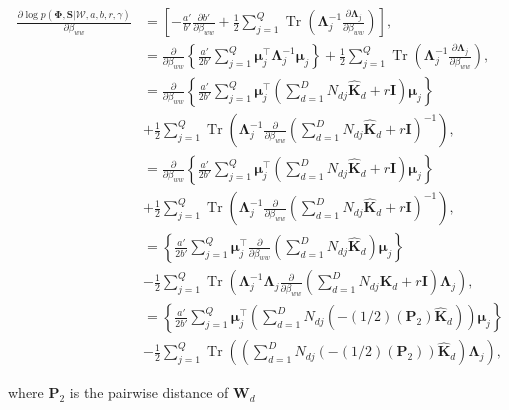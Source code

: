 \documentclass[]{article}
\newcommand{\C}{\boldsymbol{\Lambda}_j}
\newcommand{\muJ}{\boldsymbol{\mu}_j}
\newcommand{\W}{\boldsymbol{\mathcal{W}}}
\newcommand{\projMatI}{\mathbf{W}_d}
\newcommand{\Kaww}{\mathbf{\hat{K}}_d }
\newcommand{\likel}{\log p\left(\boldsymbol{\Phi},\mathbf{S}|\W,a,b,r,\gamma\right)}
\begin{document}
\begin{align}
\frac{\partial \likel}{\partial \beta_{ww}} &= \left[-\frac{a'}{b'}\frac{\partial b'}{\partial\beta_{ww}} + \frac{1}{2}\sum_{j=1}^{Q} \operatorname{Tr}\left(\C^{-1}\frac{\partial \C}{\partial \beta_{ww}}\right)\right], \\
& =  \frac{\partial }{\partial \beta_{ww}}\left\{\frac{a'}{2b'}\sum\limits_{j=1}^{Q}\boldsymbol{\mu}_j^\top \C^{-1}\muJ\right\} +\frac{1}{2}\sum_{j=1}^{Q} \operatorname{Tr}\left(\C^{-1}\frac{\partial \C}{\partial \beta_{ww}}\right), \\
& =  \frac{\partial }{\partial \beta_{ww}}\left\{\frac{a'}{2b'}\sum\limits_{j=1}^{Q}\boldsymbol{\mu}_j^\top \left(\sum\limits_{d=1}^{D}{N_{dj}\Kaww+r\mathbf{I}}\right)\muJ\right\} \\
& +\frac{1}{2}\sum_{j=1}^{Q} \operatorname{Tr}\left(\C^{-1}\frac{\partial }{\partial \beta_{ww}}\left(\sum\limits_{d=1}^{D}{N_{dj}\Kaww+r\mathbf{I}}\right)^{-1}\right),\\
& =  \frac{\partial }{\partial \beta_{ww}}\left\{\frac{a'}{2b'}\sum\limits_{j=1}^{Q}\boldsymbol{\mu}_j^\top \left(\sum\limits_{d=1}^{D}{N_{dj}\Kaww+r\mathbf{I}}\right)\muJ\right\} \\
&+\frac{1}{2}\sum_{j=1}^{Q} \operatorname{Tr}\left(\C^{-1}\frac{\partial }{\partial \beta_{ww}}\left(\sum\limits_{d=1}^{D}{N_{dj}\Kaww+r\mathbf{I}}\right)^{-1}\right),\\
& =  \left\{\frac{a'}{2b'}\sum\limits_{j=1}^{Q}\boldsymbol{\mu}_j^\top \frac{\partial }{\partial \beta_{ww}}\left(\sum\limits_{d=1}^{D}{N_{dj}\Kaww}\right)\muJ\right\} \\
&-\frac{1}{2}\sum_{j=1}^{Q} \operatorname{Tr}\left(\C^{-1}\C \frac{\partial }{\partial \beta_{ww}}\left(\sum\limits_{d=1}^{D}{N_{dj}\Kaww+r\mathbf{I}}\right)\C\right),\\
& =  \left\{\frac{a'}{2b'}\sum\limits_{j=1}^{Q}\boldsymbol{\mu}_j^\top \left(\sum\limits_{d=1}^{D}{N_{dj}\left(-(1/2)\left(\mathbf{P}_2\right)\Kaww\right)}\right)\muJ\right\} \\
&-\frac{1}{2}\sum_{j=1}^{Q} \operatorname{Tr}\left( \left(\sum\limits_{d=1}^{D}{N_{dj}
	\left(-(1/2)\left(\mathbf{P}_2\right)\right)\Kaww}\right)\C\right),
\end{align}

where $\mathbf{P}_2$ is the pairwise distance of $\projMatI$

\end{document}
